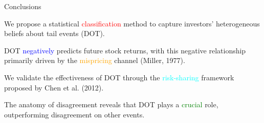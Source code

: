 \documentclass[11pt, aspectratio=169]{beamer}
\newenvironment{wideitemize}{\itemize\addtolength{\itemsep}{10pt}}{\enditemize}
\begin{document}
\begin{frame}{Conclusions}
\begin{wideitemize}
    \item We propose a statistical \textcolor{red}{classification} method to capture investors' heterogeneous beliefs about tail events (DOT).
    \item DOT \textcolor{blue}{negatively} predicts future stock returns, with this negative relationship primarily driven by the \textcolor{orange}{mispricing} channel (Miller, 1977).
    \item We validate the effectiveness of DOT through the \textcolor{cyan}{risk-sharing} framework proposed by Chen et al. (2012).
    \item The anatomy of disagreement reveals that DOT plays a \textcolor{green}{crucial} role, outperforming disagreement on other events.
\end{wideitemize}
\end{frame}
\end{document}
